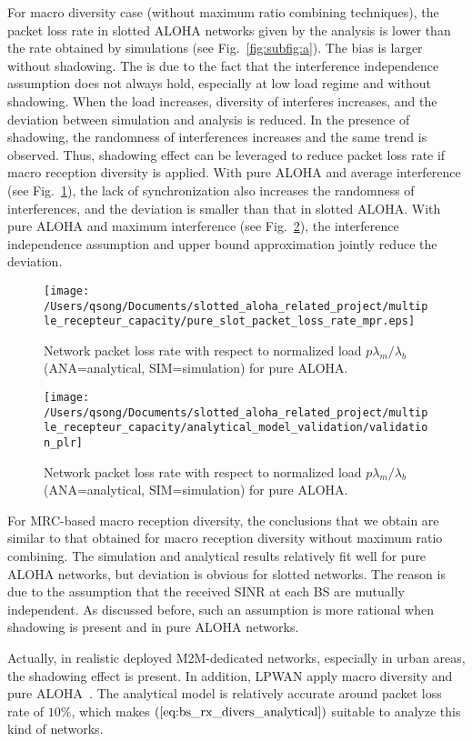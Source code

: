 For macro diversity case (without maximum ratio combining techniques), the packet loss rate in slotted ALOHA networks given by the analysis is lower than the rate obtained by simulations (see Fig.~\ref{fig:subfig:a}). The bias is larger without shadowing. The is due to the fact that the interference independence assumption does not always hold, especially at low load regime and without shadowing. When the load increases, diversity of interferes increases, and the deviation between simulation and analysis is reduced. In the presence of shadowing, the randomness of interferences increases and the same trend is observed. Thus, shadowing effect can be leveraged to reduce packet loss rate if macro reception diversity is applied. With pure ALOHA and average interference (see Fig.~\ref{fig:subfig:b}), the lack of synchronization also increases the randomness of interferences, and the deviation is smaller than that in slotted ALOHA. With pure ALOHA and maximum interference (see Fig.~\ref{fig:subfig:c}), the interference independence assumption and upper bound approximation jointly reduce the deviation.
\begin{figure}[!tb]
	\centering
	\texttt{[image: /Users/qsong/Documents/slotted\_aloha\_related\_project/multiple\_recepteur\_capacity/pure\_slot\_packet\_loss\_rate\_mpr.eps]}
	\caption{Network packet loss rate with respect to normalized load $p\lambda_{m}/\lambda_{b}$ (ANA=analytical, SIM=simulation) for pure ALOHA.}
	\label{fig:subfig:b} 
\end{figure}
\begin{figure}[!tb]
	\centering
	\texttt{[image: /Users/qsong/Documents/slotted\_aloha\_related\_project/multiple\_recepteur\_capacity/analytical\_model\_validation/validation\_plr]}
	\caption{Network packet loss rate with respect to normalized load $p\lambda_{m}/\lambda_{b}$ (ANA=analytical, SIM=simulation) for pure ALOHA. }
	\label{fig:subfig:c} 
\end{figure}

For MRC-based macro reception diversity, the conclusions that we obtain are similar to that obtained for macro reception diversity without maximum ratio combining. The simulation and analytical results relatively fit well for pure ALOHA networks, but deviation is obvious for slotted networks. The reason is due to the assumption that the received SINR at each BS are mutually independent. As discussed before, such an assumption is more rational when shadowing is present and in pure ALOHA networks.

Actually, in realistic deployed M2M-dedicated networks, especially in urban areas, the shadowing effect is present. In addition, LPWAN apply macro diversity and pure ALOHA~\cite{ietf-lpwan-overview-03}. The analytical model is relatively accurate around packet loss rate of $10\%$, which makes $(\ref{eq:bs_rx_divers_analytical})$ suitable to analyze this kind of networks.

